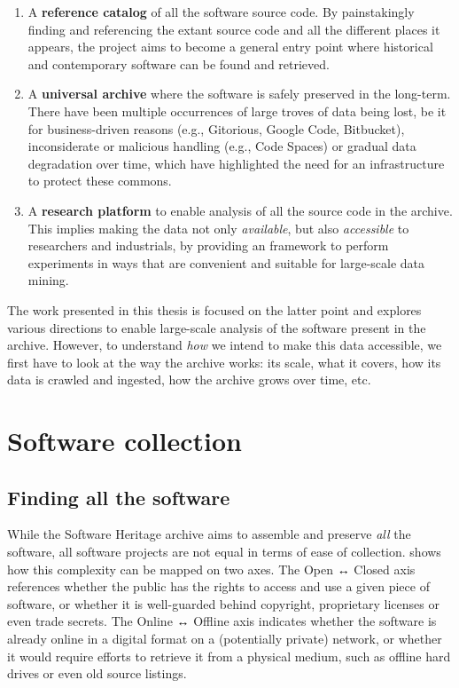 \begin{enumerate}
    \item A \textbf{reference catalog} of all the software source code. By
        painstakingly finding and referencing the extant source code and
        all the different places it appears, the project aims to become a
        general entry point where historical and contemporary software can be
        found and retrieved.
    \item A \textbf{universal archive} where the software is safely preserved
        in the long-term. There have been multiple occurrences of large troves
        of data being lost, be it for business-driven reasons (e.g., Gitorious,
        Google Code, Bitbucket), inconsiderate or malicious handling (e.g.,
        Code Spaces) or gradual data degradation over time, which have
        highlighted the need for an infrastructure to protect these commons.
    \item A \textbf{research platform} to enable analysis of all the source
        code in the archive. This implies making the data not only
        \emph{available}, but also \emph{accessible} to researchers and
        industrials, by providing an framework to perform experiments in ways
        that are convenient and suitable for large-scale data mining.
\end{enumerate}

The work presented in this thesis is focused on the latter point and explores
various directions to enable large-scale analysis of the software present in
the archive. However, to understand \emph{how} we intend to make this data
accessible, we first have to look at the way the archive works: its scale, what
it covers, how its data is crawled and ingested, how the archive grows over
time, etc.

\section{Software collection}

\subsection{Finding all the software}

While the Software Heritage archive aims to assemble and preserve \emph{all}
the software, all software projects are not equal in terms of ease of
collection.  shows how this complexity can be
mapped on two axes. The Open ↔ Closed axis references whether the public has
the rights to access and use a given piece of software, or whether it is
well-guarded behind copyright, proprietary licenses or even trade secrets.
The Online ↔ Offline axis indicates whether the software is already online in a
digital format on a (potentially private) network, or whether it would require
efforts to retrieve it from a physical medium, such as offline hard drives or
even old source listings.

